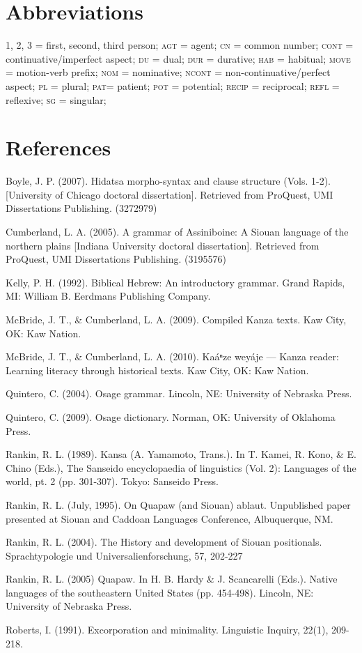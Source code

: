 \documentclass[output=paper]{LSP/langsci}
\begin{document}
\section*{Abbreviations}
1, 2, 3 = first, second, third person; \textsc{agt} = agent; \textsc{cn} = common number; \textsc{cont} = continuative/imperfect aspect; \textsc{du} = dual; \textsc{dur} = durative; \textsc{hab} = habitual; \textsc{move} = motion-verb prefix; \textsc{nom} = nominative; \textsc{ncont} = non-continuative/perfect aspect; \textsc{pl} = plural; \textsc{pat}= patient; \textsc{pot} = potential; \textsc{recip} = reciprocal; \textsc{refl} = reflexive; \textsc{sg} = singular; 

\section*{References}


\printbibliography[heading=subbibliography,notkeyword=this]

\begin{reflist}

Boyle, J. P. (2007). Hidatsa morpho-syntax and clause structure (Vols. 1-2). [University of Chicago doctoral dissertation]. Retrieved from ProQuest, UMI Dissertations Publishing. (3272979)

Cumberland, L. A. (2005). A grammar of Assiniboine: A Siouan language of the northern plains [Indiana University doctoral dissertation]. Retrieved from ProQuest, UMI Dissertations Publishing. (3195576) 

Kelly, P. H. (1992). Biblical Hebrew: An introductory grammar. Grand Rapids, MI: William B. Eerdmans Publishing Company.

McBride, J. T., \& Cumberland, L. A. (2009). Compiled Kanza texts. Kaw City, OK: Kaw Nation.

McBride, J. T., \& Cumberland, L. A. (2010). Ka\'aⁿze wey\'aje --- Kanza reader: Learning literacy through historical texts. Kaw City, OK: Kaw Nation.

Quintero, C. (2004). Osage grammar. Lincoln, NE: University of Nebraska Press.

Quintero, C. (2009). Osage dictionary. Norman, OK: University of Oklahoma Press.

Rankin, R. L.  (1989). Kansa (A. Yamamoto, Trans.).  In T. Kamei, R. Kono, \& E. Chino (Eds.), The Sanseido encyclopaedia of linguistics (Vol. 2): Languages of the world, pt. 2 (pp. 301-307). Tokyo: Sanseido Press.

Rankin, R. L. (July, 1995). On Quapaw (and Siouan) ablaut. Unpublished paper presented at Siouan and Caddoan Languages Conference, Albuquerque, NM.

Rankin, R. L. (2004). The History and development of Siouan positionals. Sprachtypologie und Universalienforschung, 57, 202-227 

Rankin, R. L. (2005) Quapaw. In H. B. Hardy \& J. Scancarelli (Eds.). Native languages of the southeastern United States (pp. 454-498). Lincoln, NE: University of Nebraska Press.

Roberts, I. (1991). Excorporation and minimality. Linguistic Inquiry, 22(1), 209-218.

\end{reflist}
\end{document}

